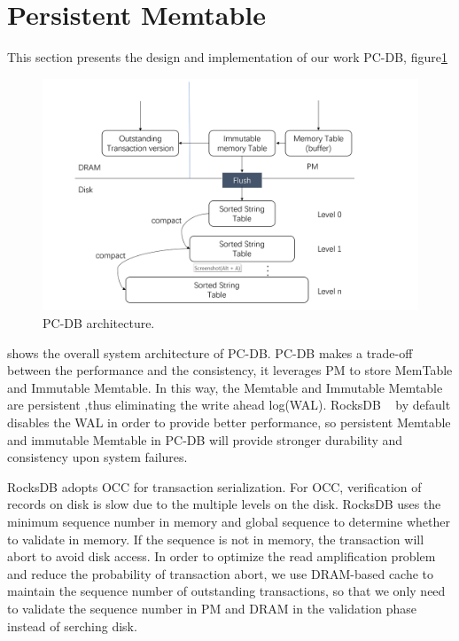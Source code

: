 \section{Persistent Memtable}

This section presents the design and implementation of our work PC-DB, figure\ref{fig:structure} 


    \begin{figure}
        \centering
        \includegraphics[width=0.36\paperwidth]{figure/structure.png}
        \caption{PC-DB architecture.}
        \label{fig:structure}
    \end{figure}
shows the overall system architecture of PC-DB. 
PC-DB makes a trade-off between the performance and the consistency, it leverages PM to store MemTable and Immutable Memtable. 
In this way, the Memtable and Immutable Memtable are persistent ,thus eliminating the write ahead log(WAL). 
RocksDB ~\cite{RocksDB} by default disables the WAL in order to provide better performance, 
so persistent Memtable and immutable Memtable in PC-DB will provide stronger durability and consistency upon system failures.

RocksDB adopts OCC for transaction serialization.
For OCC, verification of records on disk is slow due to the multiple levels on the disk. 
RocksDB uses the minimum sequence number in memory and global sequence to determine whether to validate in memory. 
If the sequence is not in memory, the transaction will abort to avoid disk access.
In order to optimize the read amplification problem and reduce the probability of transaction abort, 
we use DRAM-based cache to maintain the sequence number of outstanding transactions, 
so that we only need to validate the sequence number in PM and DRAM in the validation phase instead of serching disk.




